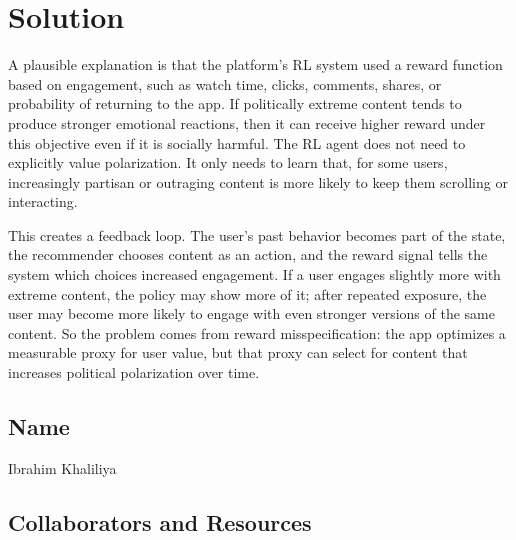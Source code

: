 \documentclass[submit]{harvardml}
\newenvironment{solution}
  {\color{blue}\section*{Solution}}
{}
\begin{document}
\begin{solution}
	A plausible explanation is that the platform's RL system used a reward function based on engagement, such as watch time, clicks, comments, shares, or probability of returning to the app. If politically extreme content tends to produce stronger emotional reactions, then it can receive higher reward under this objective even if it is socially harmful. The RL agent does not need to explicitly value polarization. It only needs to learn that, for some users, increasingly partisan or outraging content is more likely to keep them scrolling or interacting.

This creates a feedback loop. The user's past behavior becomes part of the state, the recommender chooses content as an action, and the reward signal tells the system which choices increased engagement. If a user engages slightly more with extreme content, the policy may show more of it; after repeated exposure, the user may become more likely to engage with even stronger versions of the same content. So the problem comes from reward misspecification: the app optimizes a measurable proxy for user value, but that proxy can select for content that increases political polarization over time.

\end{solution}

\newpage
\subsection*{Name}
Ibrahim Khaliliya

\subsection*{Collaborators and Resources}
\end{document}
